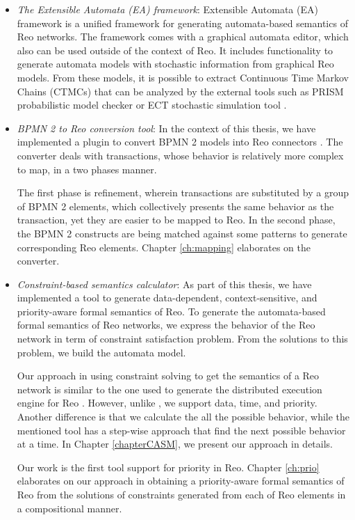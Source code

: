 \begin{itemize}
\item \emph{The Extensible Automata (EA) framework}: 
 Extensible Automata (EA) framework is a unified framework for generating automata-based semantics of Reo networks. The framework comes with a graphical automata editor, which also can be used outside of the context of Reo. It includes functionality to generate automata models with stochastic information from
graphical Reo models. From these models, it is possible to extract Continuous Time Markov Chains (CTMCs) that can be analyzed by the external tools such as PRISM probabilistic model checker \cite{Kwiatkowska} or ECT stochastic simulation tool \cite{oscarmaster}.

\item \emph{BPMN 2 to Reo conversion tool}: 
In the context of this thesis, we have implemented a plugin to convert BPMN 2 models into Reo connectors \cite{behnaz}. The converter deals with transactions, whose behavior is relatively more complex to map, in a two phases manner. 

The first phase is refinement, wherein transactions are substituted by a group of BPMN 2 elements, which collectively presents the same behavior as the transaction, yet they are easier to be mapped to Reo.  In the second phase, the BPMN 2 constructs are being matched against some patterns to generate corresponding Reo elements. Chapter \ref{ch:mapping} elaborates on the converter. %

\item \emph{Constraint-based semantics calculator}: As part of this thesis, we have implemented a tool to generate data-dependent, context-sensitive, and priority-aware formal semantics of Reo. To generate the automata-based formal semantics of Reo networks, we express the behavior of the Reo network in term of constraint satisfaction problem. From the solutions to this problem, we build the automata model. 

Our approach in using constraint solving to get the semantics of a Reo network is similar to the one used to generate the distributed execution engine for Reo \cite{ClarkeProenca10}. However, unlike \cite{ClarkeProenca10} \cite{JoseThesis} , we support data, time, and priority. Another difference is that we calculate the all the possible behavior, while the mentioned tool has a step-wise approach that find the next possible behavior at a time.  In Chapter \ref{chapterCASM}, we present our approach in details. 

Our work is the first tool support for priority in Reo. Chapter \ref{ch:prio} elaborates on our approach in obtaining a priority-aware formal semantics of Reo from the solutions of constraints generated from each of Reo elements in a compositional manner.
\end{itemize}

